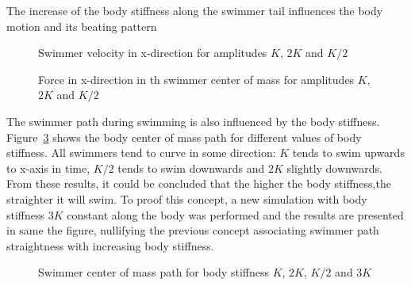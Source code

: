 The increase of the body stiffness along the swimmer tail influences the body motion and its beating pattern


\begin{figure}[H]
\centering
  \begin{footnotesize}
  
  \caption[Swimmer velocity in x-direction for amplitudes $K$, $2K$ and $K/2$ ]{Swimmer velocity in x-direction for amplitudes $K$, $2K$ and $K/2$ }
   \label{fig:Bild4.18}
  \end{footnotesize}
\end{figure}


\begin{figure}[H]
\centering
  \begin{footnotesize}
  
  \caption[Force in x-direction in th swimmer center of mass for amplitudes $K$, $2K$ and $K/2$]{Force in x-direction in th swimmer center of mass for amplitudes $K$, $2K$ and $K/2$}
   \label{fig:Bild4.19}
  \end{footnotesize}
\end{figure}

The swimmer path during swimming is also influenced by the body stiffness. Figure~\ref{fig:Bild4.20} shows the body center of mass path for different values of body stiffness. All 
swimmers tend to curve in some direction: $K$ tends to swim upwards to x-axis in time, $K/2$ tends to swim downwards and $2K$ slightly downwards. From these results, it could be
concluded that the higher the body stiffness,the straighter it will swim. To proof this concept, a new simulation with body stiffness $3K$ constant along the body was 
performed and the results are presented in same the figure, nullifying the previous concept associating swimmer path straightness with increasing body stiffness.

\begin{figure}[H]
\centering
  \begin{footnotesize}
  
  \caption[Swimmer center of mass path for body stiffness $K$, $2K$, $K/2$ and $3K$]{Swimmer center of mass path for body stiffness $K$, $2K$, $K/2$ and $3K$}
   \label{fig:Bild4.20}
  \end{footnotesize}
\end{figure}

